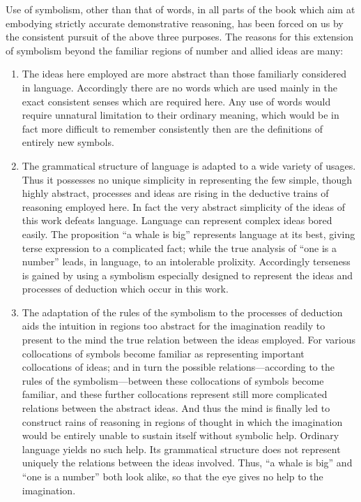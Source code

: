 \documentclass[letterpaper,12pt,openany,leqno]{book}
\begin{document}
Use of symbolism, other than that of words, in all parts of the book which aim at embodying strictly accurate demonstrative reasoning, has been forced on us by the consistent pursuit of the above three purposes. The reasons for this extension of symbolism beyond the familiar regions of number and allied ideas are many: 

\begin{enumerate}[wide, label=(\arabic*), labelwidth=!, labelindent=20pt]
	\item The ideas here employed are more abstract than those familiarly considered in language. Accordingly there are no words which are used mainly in the exact consistent senses which are required here. Any use of words would require unnatural limitation to their ordinary meaning, which would be in fact more difficult to remember consistently then are the definitions of entirely new symbols. 
	\item The grammatical structure of language is adapted to a wide variety of usages. Thus it possesses no unique simplicity in representing the few simple, though highly abstract, processes and ideas are rising in the deductive trains of reasoning employed here. In fact the very abstract simplicity of the ideas of this work defeats language. Language can represent complex ideas bored easily. The proposition ``a whale is big'' represents language at its best, giving terse expression to a complicated fact; while the true analysis of ``one is a number'' leads, in language, to an intolerable prolixity. Accordingly terseness is gained by using a symbolism especially designed to represent the ideas and processes of deduction which occur in this work.
	\item The adaptation of the rules of the symbolism to the processes of deduction aids the intuition in regions too abstract for the imagination readily to present to the mind the true relation between the ideas employed. For various collocations of symbols become familiar as representing important collocations of ideas; and in turn the possible relations---according to the rules of the symbolism---between these collocations of symbols become familiar, and these further collocations represent still more complicated relations between the abstract ideas. And thus the mind is finally led to construct rains of reasoning in regions of thought in which the imagination would be entirely unable to sustain itself without symbolic help. Ordinary language yields no such help. Its grammatical structure does not represent uniquely the relations between the ideas involved. Thus, ``a whale is big'' and ``one is a number'' both look alike, so that the eye gives no help to the imagination.

\end{enumerate}
\end{document}

